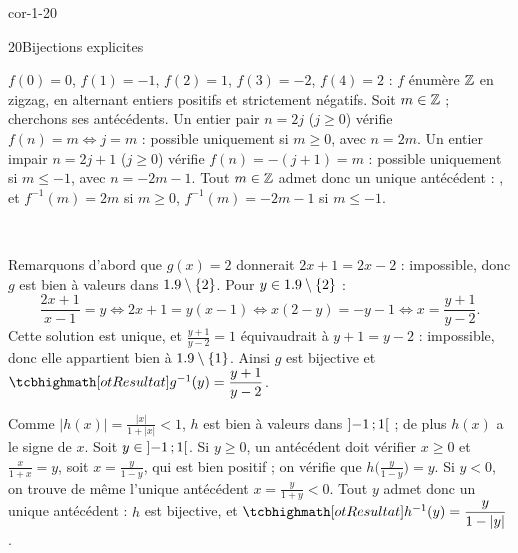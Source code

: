 \begin{blocLivre}{cor-1-20}
\begin{corrige}{20}{Bijections explicites}
\begin{questions}
  \item $f(0)=0$, $f(1)=-1$, $f(2)=1$, $f(3)=-2$, $f(4)=2$ : $f$ énumère $\mathbb{Z}$ en zigzag, en alternant
    entiers positifs et strictement négatifs. Soit $m\in\mathbb{Z}$ ; cherchons ses antécédents. Un entier pair
    $n=2j$ ($j\geq0$) vérifie $f(n)=m\iff j=m$ : possible uniquement si $m\geq0$, avec $n=2m$. Un
    entier impair $n=2j+1$ ($j\geq0$) vérifie $f(n)=-(j+1)=m$ : possible uniquement si $m\leq-1$, avec
    $n=-2m-1$. Tout $m\in\mathbb{Z}$ admet donc un unique antécédent : , et
    $f^{-1}(m)=2m$ si $m\geq0$, $f^{-1}(m)=-2m-1$ si $m\leq-1$.
\begin{center}
\\[0.5mm]
\end{center}
  \item Remarquons d'abord que $g(x)=2$ donnerait $2x+1=2x-2$ : impossible, donc $g$ est bien à
    valeurs dans $1.9\setminus\left\{2\right\}$. Pour $y\in1.9\setminus\left\{2\right\}$ :
    \[\frac{2x+1}{x-1}=y\iff2x+1=y(x-1)\iff x(2-y)=-y-1\iff x=\frac{y+1}{y-2}.\]
    Cette solution est unique, et $\frac{y+1}{y-2}=1$ équivaudrait à $y+1=y-2$ : impossible, donc elle
    appartient bien à $1.9\setminus\left\{1\right\}$. Ainsi $g$ est bijective et
    $\res{g^{-1}(y)=\dfrac{y+1}{y-2}}$.
  \item Comme $|h(x)|=\frac{|x|}{1+|x|}<1$, $h$ est bien à valeurs dans $\mathopen{]}-1\,{;}\,1\mathclose{[}$ ; de plus
    $h(x)$ a le signe de $x$. Soit $y\in\mathopen{]}-1\,{;}\,1\mathclose{[}$. Si $y\geq0$, un antécédent doit vérifier
    $x\geq0$ et $\frac{x}{1+x}=y$, soit $x=\frac{y}{1-y}$, qui est bien positif ; on vérifie que
    $h\bigl(\frac{y}{1-y}\bigr)=y$. Si $y<0$, on trouve de même l'unique antécédent
    $x=\frac{y}{1+y}<0$. Tout $y$ admet donc un unique antécédent : $h$ est bijective, et
    $\res{h^{-1}(y)=\dfrac{y}{1-|y|}}$.
\end{questions}
\end{corrige}
\end{blocLivre}

